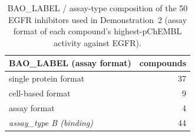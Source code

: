\begin{table}[h]\centering
\caption{BAO\_LABEL / assay-type composition of the 50 EGFR inhibitors used in Demonstration~2 (assay format of each compound's highest-pChEMBL activity against EGFR).}
\label{tbl:egfr_assays}
\begin{tabular}{lr}
\toprule
BAO\_LABEL (assay format) & compounds \\
\midrule
single protein format & 37 \\
cell-based format & 9 \\
assay format & 4 \\
\midrule
\textit{assay\_type B (binding)} & 44 \\
\bottomrule
\end{tabular}
\end{table}